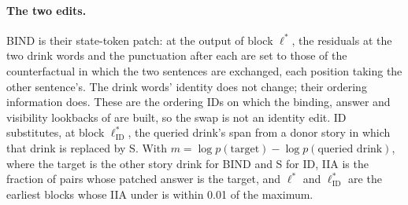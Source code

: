 \paragraph{The two edits.} BIND is their state-token patch: at the output of block $\ell^*$, the residuals at the two drink words and the punctuation after each are set to those of the counterfactual in which the two sentences are exchanged, each position taking the other sentence's. The drink words' identity does not change; their ordering information does. These are the ordering IDs on which the binding, answer and visibility lookbacks of \citet{prakash2025lookbacks} are built, so the swap is not an identity edit. ID substitutes, at block $\ell^*_{\mathrm{ID}}$, the queried drink's span from a donor story in which that drink is replaced by S. With $m = \log p(\text{target}) - \log p(\text{queried drink})$, where the target is the other story drink for BIND and S for ID, IIA is the fraction of pairs whose patched answer is the target, and $\ell^*$ and $\ell^*_{\mathrm{ID}}$ are the earliest blocks whose IIA under \fmtNone{} is within 0.01 of the maximum.

\begin{table}[!ht]
\centering
\small
\caption{\textbf{Replication of the binding swap} (Qwen2.5-14B-Instruct, \fmtNone{}, IIA of BIND by patched block). Released: the per-layer values published with \citet{prakash2025lookbacks} on their 80 validation pairs, transcribed from their release (not part of our results). Ours: \PkN{} pairs, and the \PkSharedN{} pairs shared with their validation split (exploratory). Recomputed from our sweep files; a reproduction check, since the released values were seen before preregistration H was finalised.}
\label{tab:replication}

\end{table}

